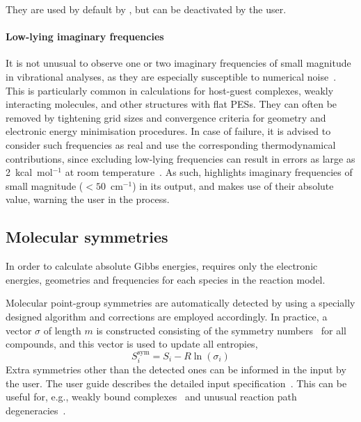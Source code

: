 % 
They are used by default by \overreact,
but can be deactivated by the user.

\paragraph{Low-lying imaginary frequencies}

It is not unusual to observe one or two imaginary frequencies of small magnitude in vibrational analyses,
as they are especially susceptible to numerical noise~\cite{Jensen_2015}.
This is particularly common in calculations for host-guest complexes,
weakly interacting molecules,
and other structures with flat PESs.
They can often be removed by tightening grid sizes and convergence criteria for geometry and electronic energy minimisation procedures.
In case of failure,
it is advised to consider such frequencies as real and use the corresponding thermodynamical contributions,
since excluding low-lying frequencies can result in errors as large as 2~kcal~mol$^{-1}$ at room temperature~\cite{Jensen_2015}.
As such,
\overreact highlights imaginary frequencies of small magnitude ($< 50$~cm$^{-1}$) in its output,
and makes use of their absolute value,
warning the user in the process.

\subsection{Molecular symmetries}%
\label{sec:mol-sym}

In order to calculate absolute Gibbs energies,
\overreact requires only the electronic energies,
geometries and frequencies for each species in the reaction model.

Molecular point-group symmetries are automatically detected by \overreact using a specially designed algorithm
and corrections are employed accordingly.
In practice,
a vector $\sigma$ of length $m$ is constructed consisting of the symmetry numbers~\cite{Fern_ndez_Ramos_2007,Gilson_2010} for all compounds,
and this vector is used to update all entropies,
% 
\begin{equation}
	S_i^\text{sym}
	= S_i - R \ln{\left( \sigma_i \right)}
\end{equation}
% 
Extra symmetries other than the detected ones can be informed in the input by the user.
The user guide describes the detailed input specification~\cite{overreactguideinput2022}.
This can be useful for,
e.g.,
weakly bound complexes~\cite{Gilson_2010} and unusual reaction path degeneracies~\cite{Fern_ndez_Ramos_2007}.

